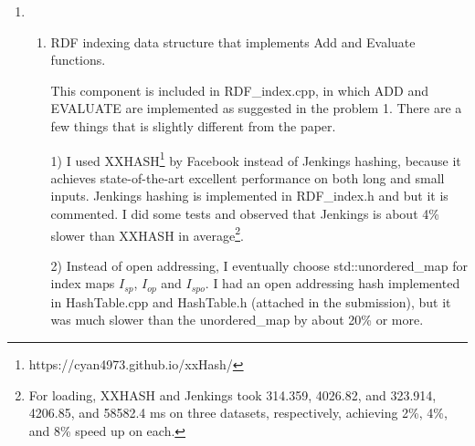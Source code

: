 \documentclass{article}
\begin{document}
\begin{enumerate}
\begin{enumerate}
\begin{algorithm}[H]
\caption{Evaluate $\langle X, Y, o\rangle$}\label{alg:evaluateXYO}
\begin{algorithmic}
\Require $t = \langle X, Y, o\rangle$, where $X$ and $Y$ are special codes stand for variables. 
\Do
{}
\State $t'\leftarrow$ the triple $I_{o}$ points to, \textit{index} $\leftarrow$ $t'.N_{op}$.
\Else 
\State $t'\leftarrow t.N_{op}$, \textit{index} $\leftarrow t'.N_{op}$
\EndIf
{}
\State \textit{index} = \textit{EndSearch}
\EndIf
\end{algorithmic}
\end{algorithm}
The ideas for the other two patterns are similar; start from $I_p$ or $I_s$ map and traverse the $p$-list or $sp$-list.

When there are three free variables, the paper suggests to match, for example, the patterns like $\langle X, Y, Z\rangle$, we need to iterate over the triple table; if we want $X = Y$,  we skip those $X\neq Y$. However, this is not efficient. Therefore, I modified a little bit and the idea and pseudo-code are discussed in 2.a, where I put everything that is different from the paper there. 

\end{enumerate}
\item 
\begin{enumerate}
\item RDF indexing data structure that implements Add and Evaluate functions.

This component is included in RDF\_index.cpp, in which ADD and EVALUATE are implemented as suggested in the problem 1. There are a few things that is slightly different from the paper. 

1) I used XXHASH\footnote{https://cyan4973.github.io/xxHash/} by Facebook instead of Jenkings hashing, because it achieves state-of-the-art excellent performance on both long and small inputs. Jenkings hashing is implemented in RDF\_index.h and but it is commented. I did some tests and observed that Jenkings is about 4\% slower than XXHASH in average\footnote{For loading, XXHASH and Jenkings took 314.359, 4026.82, and 323.914, 4206.85, and 58582.4 ms on three datasets, respectively, achieving 2\%, 4\%, and 8\% speed up on each.}. 

2) Instead of open addressing, I eventually choose std::unordered\_map for index maps $I_{sp}$, $I_{op}$ and $I_{spo}$. I had an open addressing hash implemented in HashTable.cpp and HashTable.h (attached in the submission), but it was much slower than the unordered\_map by about 20\% or more.


\end{enumerate}
\end{enumerate}
\end{document}
